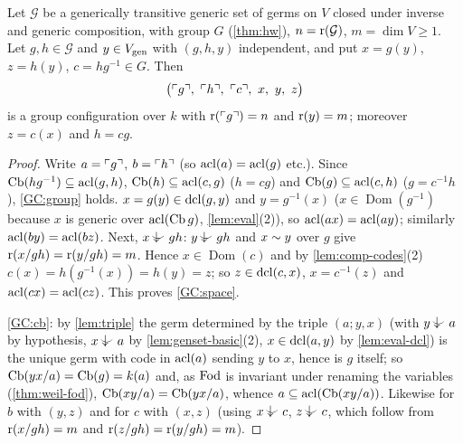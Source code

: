 \begin{proposition}\label{prop:converse}
Let $\mathcal G$ be a generically transitive generic set of germs on $V$ closed under
inverse and generic composition, with group $G$ (\cref{thm:hw}), $n=\operatorname{r}(\mathcal G)$,
$m=\dim V\ge1$.  Let $g,h\in\mathcal G$ and $y\in V_{\operatorname{gen}}$ with $(g,h,y)$ independent,
and put $x=g(y)$, $z=h(y)$, $c=hg^{-1}\in G$.  Then
\[
  \bigl(\code g,\ \code h,\ \code c,\ x,\ y,\ z\bigr)
\]
is a group configuration over $k$ with $\operatorname{r}(\ulcorner g\urcorner)=n$ and $\operatorname{r}(y)=m$; moreover
$z=c(x)$ and $h=cg$.
\end{proposition}
\begin{proof}
Write $a=\ulcorner g\urcorner$, $b=\ulcorner h\urcorner$ (so $\operatorname{acl}(a)=\operatorname{acl}(g)$ etc.).  Since $\operatorname{Cb}(hg^{-1})\subseteq\operatorname{acl}(g,h)$,
$\operatorname{Cb}(h)\subseteq\operatorname{acl}(c,g)$ ($h=cg$) and $\operatorname{Cb}(g)\subseteq\operatorname{acl}(c,h)$ ($g=c^{-1}h$), \ref{GC:group}
holds.  $x=g(y)\in\operatorname{dcl}(g,y)$ and $y=g^{-1}(x)$ ($x\in\operatorname{Dom}(g^{-1})$ because
$x$ is generic over $\operatorname{acl}(\operatorname{Cb} g)$, \cref{lem:eval}(2)), so $\operatorname{acl}(ax)=\operatorname{acl}(ay)$; similarly
$\operatorname{acl}(by)=\operatorname{acl}(bz)$.  Next, $x\ind{}gh$: $y\ind{}gh$ and $x\sim y$ over $g$ give
$\operatorname{r}(x/gh)=\operatorname{r}(y/gh)=m$.  Hence $x\in\operatorname{Dom}(c)$ and by \cref{lem:comp-codes}(2)
$c(x)=h(g^{-1}(x))=h(y)=z$; so $z\in\operatorname{dcl}(c,x)$, $x=c^{-1}(z)$ and $\operatorname{acl}(cx)=\operatorname{acl}(cz)$.
This proves \ref{GC:space}.

\ref{GC:cb}: by \cref{lem:triple} the germ determined by the triple $(a;y,x)$ (with
$y\ind{}a$ by hypothesis, $x\ind{}a$ by \cref{lem:genset-basic}(2), $x\in\operatorname{dcl}(a,y)$ by
\cref{lem:eval-dcl}) is the unique germ with code in $\operatorname{acl}(a)$ sending $y$ to $x$, hence
is $g$ itself; so $\operatorname{Cb}(yx/a)=\operatorname{Cb}(g)=k(a)$ and, as $\operatorname{Fod}$ is invariant under renaming the
variables (\cref{thm:weil-fod}), $\operatorname{Cb}(xy/a)=\operatorname{Cb}(yx/a)$, whence
$a\subseteq\operatorname{acl}(\operatorname{Cb}(xy/a))$.  Likewise for $b$ with $(y,z)$ and for $c$ with $(x,z)$
(using $x\ind{}c$, $z\ind{}c$, which follow from $\operatorname{r}(x/gh)=m$ and
$\operatorname{r}(z/gh)=\operatorname{r}(y/gh)=m$).


\end{proof}
